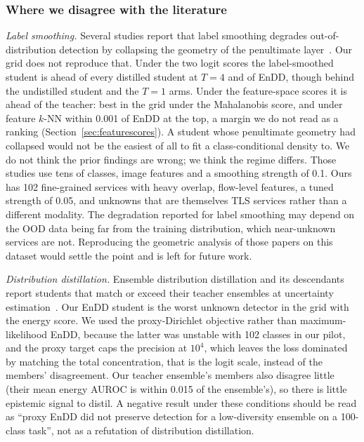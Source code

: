 \documentclass[journal]{IEEEtran}
\begin{document}
\subsubsection*{Where we disagree with the literature}
\emph{Label smoothing.} Several studies report that label smoothing degrades out-of-distribution detection by collapsing the geometry of the penultimate layer~\cite{softlabelsood,lsembedding,adaptivels,lsselective}. Our grid does not reproduce that. Under the two logit scores the label-smoothed student is ahead of every distilled student at $T=4$ and of EnDD, though behind the undistilled student and the $T=1$ arms. Under the feature-space scores it is ahead of the teacher: best in the grid under the Mahalanobis score, and under feature $k$-NN within 0.001 of EnDD at the top, a margin we do not read as a ranking (Section~\ref{sec:featurescores}). A student whose penultimate geometry had collapsed would not be the easiest of all to fit a class-conditional density to. We do not think the prior findings are wrong; we think the regime differs. Those studies use tens of classes, image features and a smoothing strength of 0.1. Ours has 102 fine-grained services with heavy overlap, flow-level features, a tuned strength of 0.05, and unknowns that are themselves TLS services rather than a different modality. The degradation reported for label smoothing may depend on the OOD data being far from the training distribution, which near-unknown services are not. Reproducing the geometric analysis of those papers on this dataset would settle the point and is left for future work.

\emph{Distribution distillation.} Ensemble distribution distillation and its descendants report students that match or exceed their teacher ensembles at uncertainty estimation~\cite{logitendd,selfdistdist,credalendd}. Our EnDD student is the worst unknown detector in the grid with the energy score. We used the proxy-Dirichlet objective rather than maximum-likelihood EnDD, because the latter was unstable with 102 classes in our pilot, and the proxy target caps the precision at $10^4$, which leaves the loss dominated by matching the total concentration, that is the logit scale, instead of the members' disagreement. Our teacher ensemble's members also disagree little (their mean energy AUROC is within 0.015 of the ensemble's), so there is little epistemic signal to distil. A negative result under these conditions should be read as ``proxy EnDD did not preserve detection for a low-diversity ensemble on a 100-class task'', not as a refutation of distribution distillation.
\end{document}
